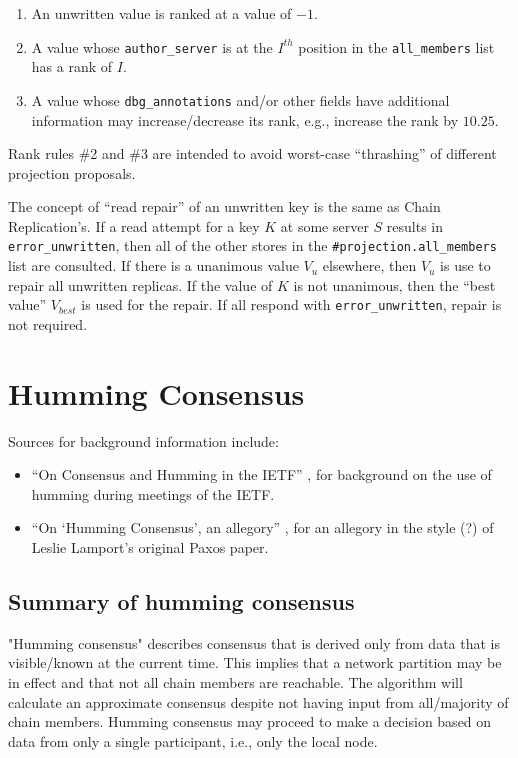 \documentclass[preprint,10pt]{sigplanconf}
\begin{document}
\begin{enumerate}
\item An unwritten value is ranked at a value of $-1$.
\item A value whose {\tt author\_server} is at the $I^{th}$ position
  in the {\tt all\_members} list has a rank of $I$.
\item A value whose {\tt dbg\_annotations} and/or other fields have
  additional information may increase/decrease its rank, e.g.,
  increase the rank by $10.25$.
\end{enumerate}

Rank rules \#2 and \#3 are intended to avoid worst-case ``thrashing''
of different projection proposals.

The concept of ``read repair'' of an unwritten key is the same as
Chain Replication's.  If a read attempt for a key $K$ at some server
$S$ results in {\tt error\_unwritten}, then all of the other stores in
the {\tt \#projection.all\_members} list are consulted.  If there is a
unanimous value $V_{u}$ elsewhere, then $V_{u}$ is use to repair all
unwritten replicas.  If the value of $K$ is not unanimous, then the
``best value'' $V_{best}$ is used for the repair.  If all respond with
{\tt error\_unwritten}, repair is not required.

\section{Humming Consensus}
\label{sec:humming-consensus}

Sources for background information include:

\begin{itemize}
\item ``On Consensus and Humming in the IETF'' \cite{rfc-7282}, for
background on the use of humming during meetings of the IETF.

\item ``On `Humming Consensus', an allegory'' \cite{humming-consensus-allegory},
for an allegory in the style (?) of Leslie Lamport's original Paxos
paper.
\end{itemize}


\subsection{Summary of humming consensus}

"Humming consensus" describes
consensus that is derived only from data that is visible/known at the current
time.  This implies that a network partition may be in effect and that
not all chain members are reachable.  The algorithm will calculate
an approximate consensus despite not having input from all/majority
of chain members.  Humming consensus may proceed to make a
decision based on data from only a single participant, i.e., only the local
node.
\end{document}
